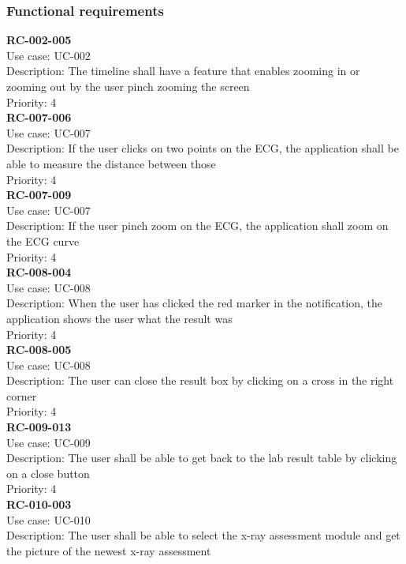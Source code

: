 \subsubsection{Functional requirements}
\textbf{RC-002-005} \\
Use case: UC-002 \\
Description: The timeline shall have a feature that enables zooming in or zooming out by the user pinch zooming the screen\\
Priority: 4\\
\newline
\textbf{RC-007-006} \\
Use case: UC-007 \\
Description: If the user clicks on two points on the ECG, the application shall be able to measure the distance between those \\
Priority: 4 \\
\newline
\textbf{RC-007-009} \\
Use case: UC-007 \\
Description: If the user pinch zoom on the ECG, the application shall zoom on the ECG curve\\
Priority: 4 \\
\newline
\textbf{RC-008-004} \\
Use case: UC-008 \\
Description: When the user has clicked the red marker in the notification, the application shows the user what the result was \\
Priority: 4 \\
\newline
\textbf{RC-008-005} \\
Use case: UC-008 \\
Description: The user can close the  result box by clicking on a cross in the right corner\\
Priority: 4 \\
\newline
\textbf{RC-009-013} \\
Use case: UC-009 \\
Description: The user shall be able to get back to the lab result table by clicking on a close button \\
Priority: 4 \\
\newline
\textbf{RC-010-003} \\
Use case: UC-010 \\
Description: The user shall be able to select the x-ray assessment module and get the picture of the newest x-ray assessment\\
